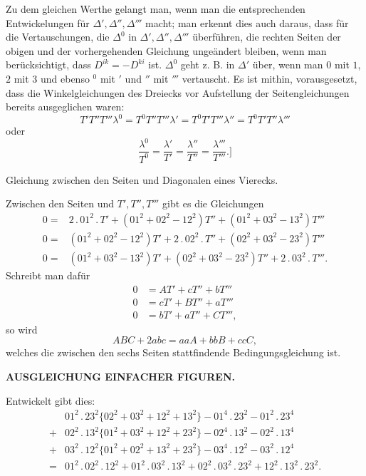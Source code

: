 Zu dem gleichen Werthe gelangt man, wenn man die entsprechenden Entwickelungen für \(\Delta',\Delta'',\Delta'''\) macht; man erkennt dies auch daraus, dass für die Vertauschungen, die \(\Delta^0\) in \(\Delta',\Delta'',\Delta'''\) überführen, die rechten Seiten der obigen und der vorhergehenden Gleichung ungeändert bleiben, wenn man berücksichtigt, dass \(D^{ik}=-D^{ki}\) ist. \(\Delta^0\) geht z. B. in \(\Delta'\) über, wenn man \(0\) mit \(1\), \(2\) mit \(3\) und ebenso \({}^0\) mit \({}'\) und \({}''\) mit \({}'''\) vertauscht. Es ist mithin, vorausgesetzt, dass die Winkelgleichungen des Dreiecks vor Aufstellung der Seitengleichungen bereits ausgeglichen waren:
\[
 T'T''T'''\lambda^0=T^0T''T'''\lambda'=T^0T'T'''\lambda''=T^0T'T''\lambda'''
\]
\noindent oder
\[
 \frac{\lambda^0}{T^0}=\frac{\lambda'}{T'}=\frac{\lambda''}{T''}=\frac{\lambda'''}{T'''}.\biggr]
\]

\medskip
{\centering
[2.]\par\smallskip
Gleichung zwischen den Seiten und Diagonalen eines Vierecks.\par}
Zwischen den Seiten und \(T',T'',T'''\) gibt es die Gleichungen
\[
\begin{aligned}
 0={}&2\,.\,01^2\,.\,T'+(01^2+02^2-12^2)T''+(01^2+03^2-13^2)T'''\\
 0={}&(01^2+02^2-12^2)T'+2\,.\,02^2\,.\,T''+(02^2+03^2-23^2)T'''\\
 0={}&(01^2+03^2-13^2)T'+(02^2+03^2-23^2)T''+2\,.\,03^2\,.\,T'''.
\end{aligned}
\]
Schreibt man dafür
\[
\begin{aligned}
 0&=AT'+cT''+bT'''\\
 0&=cT'+BT''+aT'''\\
 0&=bT'+aT''+CT''',
\end{aligned}
\]
\noindent so wird
\[
 ABC+2abc=aaA+bbB+ccC,
\]
\noindent welches die zwischen den sechs Seiten stattfindende Bedingungsgleichung ist.

\par\clearpage
\noindent\null\hfill{\small\textbf{AUSGLEICHUNG EINFACHER FIGUREN.}}\hfill{}\par\medskip

Entwickelt gibt dies:
\[
\begin{aligned}
 &01^2\,.\,23^2\{02^2+03^2+12^2+13^2\}-01^4\,.\,23^2-01^2\,.\,23^4\\
 +{}&02^2\,.\,13^2\{01^2+03^2+12^2+23^2\}-02^4\,.\,13^2-02^2\,.\,13^4\\
 +{}&03^2\,.\,12^2\{01^2+02^2+13^2+23^2\}-03^4\,.\,12^2-03^2\,.\,12^4\\
 ={}&01^2\,.\,02^2\,.\,12^2+01^2\,.\,03^2\,.\,13^2+02^2\,.\,03^2\,.\,23^2+12^2\,.\,13^2\,.\,23^2.
\end{aligned}
\]

